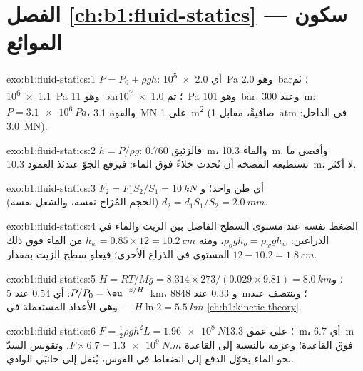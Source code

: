 \section*{الفصل \ref{ch:b1:fluid-statics} --- سكون الموائع}

\begin{solution}{exo:b1:fluid-statics:1}
$P = P_0 + \rho gh$: أي \qty{2.0e5}{Pa} وهو \qty{2.0}{bar}؛ ثم \qty{1.1e6}{Pa}
وهو \qty{11}{bar}؛ ثم \qty{1.0e7}{Pa} وهو \qty{101}{bar}. وعند \qty{300}{m}: $P =
\qty{3.1e6}{Pa}$، والقوة \qty{3.1}{MN} على \qty{1}{m^2} (صافيةً، مقابل
\qty{1}{atm} في الداخل: \qty{3.0}{MN}).
\end{solution}

\begin{solution}{exo:b1:fluid-statics:2}
$h = P/\rho g$: فالزئبق \qty{0.760}{m}، والماء \qty{10.3}{m}. وأقصى ما
تستطيعه المضخة أن تُحدث خلاءً فوق الماء: فيرفع الجوّ عندئذ
العمود \qty{10.3}{m}، لا أكثر.
\end{solution}

\begin{solution}{exo:b1:fluid-statics:3}
$F_2 = F_1S_2/S_1 = \qty{10}{kN}$ أي طن واحد؛ و $d_2 = d_1S_1/S_2 = \qty{2.0}{mm}$
(الحجم المُزاح نفسه، والشغل نفسه).
\end{solution}

\begin{solution}{exo:b1:fluid-statics:4}
الضغط نفسه عند مستوى السطح الفاصل بين الزيت والماء في
الذراعين: $\rho_og
h_o = \rho_wgh_w$، ومنه $h_w = 0.85 \times 12 = \qty{10.2}{cm}$ من الماء فوق
ذلك المستوى في الذراع الأخرى؛ فيعلو سطح الزيت بمقدار $12 - 10.2 = \qty{1.8}{cm}$.
\end{solution}

\begin{solution}{exo:b1:fluid-statics:5}
$H = RT/Mg = 8.314 \times 273/(0.029 \times 9.81) = \qty{8.0}{km}$؛ و $P/P_0 =
\eu^{-z/H}$: أي $0.54$ عند \qty{5}{km}، و $0.33$ عند \qty{8848}{m}؛ وينتصف عند $H\ln2 =
\qty{5.5}{km}$ --- وهي الأعداد المستعملة في \cref{ch:b1:kinetic-theory}.
\end{solution}

\begin{solution}{exo:b1:fluid-statics:6}
$F = \tfrac12\rho gh^2L = \qty{1.96e8}{N}$؛  على عمق \qty{13.3}{m}،
أي \qty{6.7}{m} فوق القاعدة؛ وعزمه بالنسبة إلى القاعدة $F \times
6.7 = \qty{1.3e9}{N.m}$. وتقويس السدّ نحو الماء يحوّل الدفع
إلى انضغاط في القوس، يُنقل إلى جانبَي الوادي.
\end{solution}

